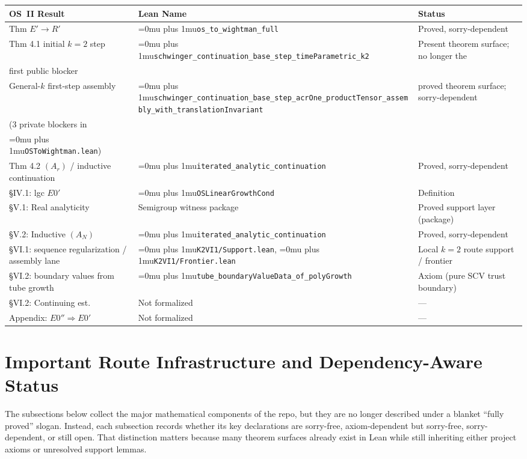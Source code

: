 \documentclass[11pt,a4paper]{article}
\newcommand{\leanfile}[1]{\begingroup\Urlmuskip=0mu plus 1mu\relax\nolinkurl{#1}\endgroup}
\newcommand{\leanname}[1]{\begingroup\Urlmuskip=0mu plus 1mu\relax\nolinkurl{#1}\endgroup}
\begin{document}
\begin{center}
{\scriptsize
\begin{longtable}{L{4.2cm}L{5.2cm}L{2.3cm}}
\toprule
\textbf{OS~II Result} & \textbf{Lean Name} & \textbf{Status} \\
\midrule
Thm $E' \to R'$ & \leanname{os\_to\_wightman\_full} & Proved, sorry-dependent \\
Thm 4.1 initial $k=2$ step &
\leanname{schwinger\_continuation\_base\_step\_timeParametric\_k2} &
Present theorem surface; no longer the\\first public blocker \\
General-$k$ first-step assembly &
\leanname{schwinger\_continuation\_base\_step\_acrOne\_productTensor\_assembly\_with\_translationInvariant} &
proved theorem surface; sorry-dependent\\(3 private blockers in\\\leanfile{OSToWightman.lean}) \\
Thm 4.2 $(A_r)$ / inductive continuation & \leanname{iterated\_analytic\_continuation} & Proved, sorry-dependent \\
\S IV.1: lgc $E0'$ & \leanname{OSLinearGrowthCond} & Definition \\
\S V.1: Real analyticity & Semigroup witness package & Proved support layer (package) \\
\S V.2: Inductive $(A_N)$ & \leanname{iterated\_analytic\_continuation} & Proved, sorry-dependent \\
\S VI.1: sequence regularization / assembly lane & \leanfile{K2VI1/Support.lean}, \leanfile{K2VI1/Frontier.lean} & Local $k=2$ route support / frontier \\
\S VI.2: boundary values from tube growth & \leanname{tube\_boundaryValueData\_of\_polyGrowth} & Axiom (pure SCV trust boundary) \\
\S VI.2: Continuing est. & Not formalized & --- \\
Appendix: $E0'' \Rightarrow E0'$ & Not formalized & --- \\
\bottomrule
\end{longtable}
}
\end{center}


\section{Important Route Infrastructure and Dependency-Aware Status}

The subsections below collect the major mathematical components of the repo, but
they are no longer described under a blanket ``fully proved'' slogan. Instead,
each subsection records whether its key declarations are sorry-free,
axiom-dependent but sorry-free, sorry-dependent, or still open. That
distinction matters because many theorem surfaces already exist in Lean while
still inheriting either project axioms or unresolved support lemmas.
\end{document}
